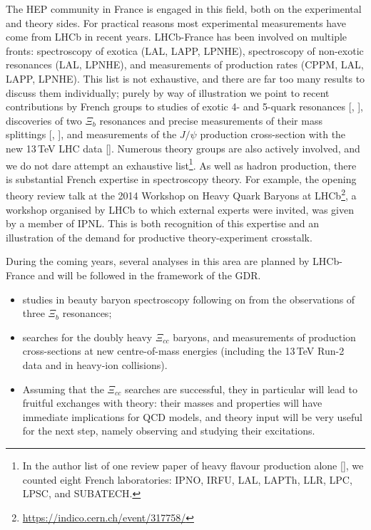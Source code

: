 The HEP community in France is engaged in this field, both on
the experimental and theory sides. For practical reasons most
experimental measurements have come from LHCb in recent years.
LHCb-France has been involved on multiple fronts:
spectroscopy of exotica (LAL, LAPP, LPNHE),
spectroscopy of non-exotic resonances (LAL, LPNHE),
and measurements of production rates (CPPM, LAL, LAPP, LPNHE).
This list is not exhaustive, and there are far too many
results to discuss them individually; purely by way of
illustration we point to recent contributions by French groups to
%
studies of exotic 4- and 5-quark resonances
[\cite{Aaij:2016ymb}, \cite{Aaij:2014jqa}],
%
discoveries of two $\Xi_b$ resonances and precise measurements
of their mass splittings [\cite{Aaij:2016jnn}, \cite{Aaij:2014yka}],
%
and measurements of the $J/\psi$ production cross-section
with the new 13\,TeV LHC data
[\cite{Aaij:2015rla}].
Numerous theory groups are also actively involved, and
we do not dare attempt an exhaustive list\footnote{
  In the author list of one review paper of heavy flavour
  production alone [\cite{Andronic:2015wma}],
  we counted eight French laboratories:
  IPNO, IRFU, LAL, LAPTh, LLR, LPC, LPSC, and SUBATECH.
}.
As well as hadron production, there is substantial French
expertise in spectroscopy theory. For example, the opening
theory review talk at the 
2014 Workshop on Heavy Quark Baryons at LHCb\footnote{
  \url{https://indico.cern.ch/event/317758/}
}, a workshop organised by LHCb to which external experts were invited,
was given by a member of IPNL. This is both recognition of
this expertise and an illustration of the demand for
productive theory-experiment crosstalk.

%



During the coming years, several analyses in this area are
planned by LHCb-France and will be followed in the framework of the GDR.

\begin{itemize}
\item studies in beauty baryon spectroscopy following on from the observations
of three $\Xi_b$ resonances;
\item searches for the doubly heavy
$\Xi_{cc}$ baryons, and measurements of production cross-sections
at new centre-of-mass energies (including the 13\,TeV Run-2
data and in heavy-ion collisions). 
\item Assuming that the $\Xi_{cc}$
searches are successful, they in particular will lead to fruitful
exchanges with theory: their masses and properties will have
immediate implications for QCD models, and theory input will be
very useful for the next step, namely observing and studying their
excitations.
\end{itemize}
